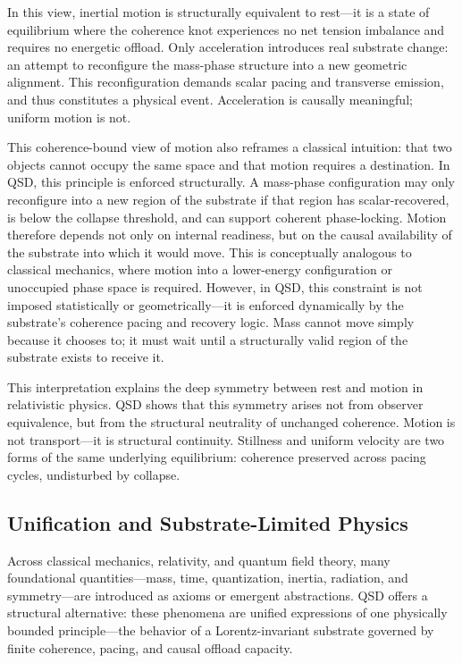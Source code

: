 \documentclass[entropy,article,submit,pdftex,moreauthors]{Definitions/mdpi}
\begin{document}
In this view, inertial motion is structurally equivalent to rest—it is a state of equilibrium where the coherence knot experiences no net tension imbalance and requires no energetic offload. Only acceleration introduces real substrate change: an attempt to reconfigure the mass-phase structure into a new geometric alignment. This reconfiguration demands scalar pacing and transverse emission, and thus constitutes a physical event. Acceleration is causally meaningful; uniform motion is not.

This coherence-bound view of motion also reframes a classical intuition: that two objects cannot occupy the same space and that motion requires a destination. In QSD, this principle is enforced structurally. A mass-phase configuration may only reconfigure into a new region of the substrate if that region has scalar-recovered, is below the collapse threshold, and can support coherent phase-locking. Motion therefore depends not only on internal readiness, but on the causal availability of the substrate into which it would move. This is conceptually analogous to classical mechanics, where motion into a lower-energy configuration or unoccupied phase space is required. However, in QSD, this constraint is not imposed statistically or geometrically—it is enforced dynamically by the substrate’s coherence pacing and recovery logic. Mass cannot move simply because it chooses to; it must wait until a structurally valid region of the substrate exists to receive it.

This interpretation explains the deep symmetry between rest and motion in relativistic physics. QSD shows that this symmetry arises not from observer equivalence, but from the structural neutrality of unchanged coherence. Motion is not transport—it is structural continuity. Stillness and uniform velocity are two forms of the same underlying equilibrium: coherence preserved across pacing cycles, undisturbed by collapse.


\subsection{Unification and Substrate-Limited Physics}

Across classical mechanics, relativity, and quantum field theory, many foundational quantities—mass, time, quantization, inertia, radiation, and symmetry—are introduced as axioms or emergent abstractions. QSD offers a structural alternative: these phenomena are unified expressions of one physically bounded principle—the behavior of a Lorentz-invariant substrate governed by finite coherence, pacing, and causal offload capacity.
\end{document}
